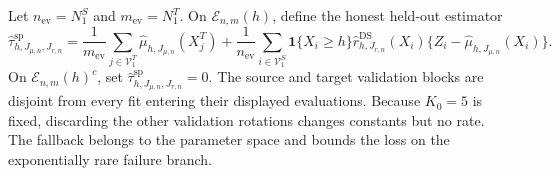 Let \(n_{\mathrm{ev}}=N^S_1\) and \(m_{\mathrm{ev}}=N^T_1\).  On \(\mathcal E_{n,m}(h)\), define the honest held-out estimator
\[
 \widehat\tau^{\mathrm{sp}}_{h,J_{\mu,n},J_{r,n}}
 =\frac1{m_{\mathrm{ev}}}\sum_{j\in\mathcal V^T_1}
 \widehat\mu_{h,J_{\mu,n}}(X_j^T)
 +\frac1{n_{\mathrm{ev}}}\sum_{i\in\mathcal V^S_1}
 \mathbf 1\{X_i\ge h\}\widehat r^{\mathrm{DS}}_{h,J_{r,n}}(X_i)
 \{Z_i-\widehat\mu_{h,J_{\mu,n}}(X_i)\}.
\]
On \(\mathcal E_{n,m}(h)^c\), set \(\widehat\tau^{\mathrm{sp}}_{h,J_{\mu,n},J_{r,n}}=0\).  The source and target validation blocks are disjoint from every fit entering their displayed evaluations.  Because \(K_0=5\) is fixed, discarding the other validation rotations changes constants but no rate.  The fallback belongs to the parameter space and bounds the loss on the exponentially rare failure branch.